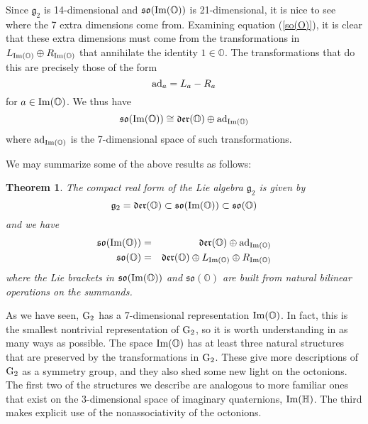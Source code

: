 \documentclass[12pt]{article}
\renewcommand\H{{\mathbb H}}
\renewcommand\O{{\mathbb O}}
\newcommand{\G}{{\rm G}}
\newcommand{\so}{{\mathfrak {so}}}
\newcommand{\g}{{\mathfrak {g}}}
\newcommand{\Der}{{\mathfrak {der}}}
\newcommand{\et}{\hspace{-0.08in}{\bf .}\hspace{0.1in}}
\renewcommand{\Im}{{\rm Im}}
\newcommand{\iso}{\cong}
\newcommand{\be}{\begin{equation}}
\newcommand{\ee}{\end{equation}}
\newcommand{\ban}{\begin{eqnarray*}}
\newcommand{\ean}{\end{eqnarray*}}
\newcommand{\ad}{{\rm ad}}
\newtheorem{thm}{Theorem}
\begin{document}
Since $\g_2$ is 14-dimensional and $\so(\Im(\O))$ is 21-dimensional, it   
is nice to see where the 7 extra dimensions come from.  Examining   
equation (\ref{so(O)}), it is clear that these extra dimensions must   
come from the transformations in $ L_{\Im(\O)} \oplus R_{\Im(\O)}$ that   
annihilate the identity $1 \in \O$.  The transformations that do this are   
precisely those of the form   
\[           \ad_a = L_a - R_a \]   
for $a \in \Im(\O)$.   We thus have    
\be  \so(\Im(\O)) \iso \Der(\O) \oplus \ad_{\Im(\O)}  \label{so(Im(O))}  \ee   
where $\ad_{\Im(\O)}$ is the 7-dimensional space of such transformations.   
   
We may summarize some of the above results as follows:   
   
\begin{thm} \et \label{g2-description} The compact real form   
of the Lie algebra $\g_2$ is given by   
\[     \g_2 = \Der(\O) \subset \so(\Im(\O)) \subset \so(\O)  \]   
and we have    
\ban      \so(\Im(\O)) &=& \Der(\O) \oplus \ad_{\Im(\O)}    \\   
          \so(\O) &=& \Der(\O) \oplus L_{\Im(\O)} \oplus R_{\Im(\O)}    
\ean   
where the Lie brackets in $\so(\Im(\O))$ and $\so(\O)$ are built   
from natural bilinear operations on the summands.     
\end{thm}   
   
As we have seen, $\G_2$ has a 7-dimensional representation $\Im(\O)$.   
In fact, this is the smallest nontrivial representation of $\G_2$,
so it is worth understanding in as many ways as possible.  The space
$\Im(\O)$ has at least three natural structures that are preserved by
the transformations in $\G_2$.  These give more descriptions of  
$\G_2$ as a symmetry group, and they also shed some new light on the   
octonions.  The first two of the structures we describe are analogous to
more familiar ones that exist on the 3-dimensional space of imaginary 
quaternions, $\Im(\H)$.  The third makes explicit use of the   
nonassociativity of the octonions.   
   
\end{document}
